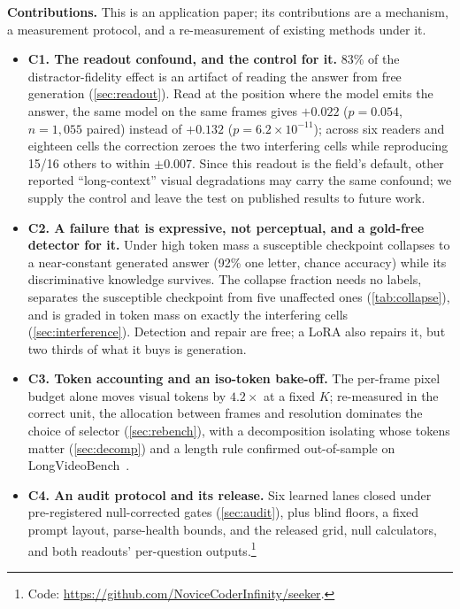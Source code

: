 \documentclass[10pt,twocolumn,letterpaper]{article}
\begin{document}
\noindent\textbf{Contributions.} This is an application paper; its contributions are a mechanism, a measurement protocol, and a re-measurement of existing methods under it.
\begin{itemize}[leftmargin=*,itemsep=0pt,parsep=0pt,topsep=1pt]
\item \textbf{C1. The readout confound, and the control for it.} 83\% of the distractor-fidelity effect is an artifact of reading the answer from free generation (\cref{sec:readout}). Read at the position where the model emits the answer, the same model on the same frames gives $+0.022$ ($p{=}0.054$, $n{=}1{,}055$ paired) instead of $+0.132$ ($p{=}6.2{\times}10^{-11}$); across six readers and eighteen cells the correction zeroes the two interfering cells while reproducing 15/16 others to within $\pm0.007$. Since this readout is the field's default, other reported ``long-context'' visual degradations may carry the same confound; we supply the control and leave the test on published results to future work.
\item \textbf{C2. A failure that is expressive, not perceptual, and a gold-free detector for it.} Under high token mass a susceptible checkpoint collapses to a near-constant generated answer (92\% one letter, chance accuracy) while its discriminative knowledge survives. The collapse fraction needs no labels, separates the susceptible checkpoint from five unaffected ones (\cref{tab:collapse}), and is graded in token mass on exactly the interfering cells (\cref{sec:interference}). Detection and repair are free; a LoRA also repairs it, but two thirds of what it buys is generation.
\item \textbf{C3. Token accounting and an iso-token bake-off.} The per-frame pixel budget alone moves visual tokens by $4.2\times$ at a fixed $K$; re-measured in the correct unit, the allocation between frames and resolution dominates the choice of selector (\cref{sec:rebench}), with a decomposition isolating whose tokens matter (\cref{sec:decomp}) and a length rule confirmed out-of-sample on LongVideoBench~\cite{wu2024longvideobench}.
\item \textbf{C4. An audit protocol and its release.} Six learned lanes closed under pre-registered null-corrected gates (\cref{sec:audit}), plus blind floors, a fixed prompt layout, parse-health bounds, and the released grid, null calculators, and both readouts' per-question outputs.\footnote{Code: \url{https://github.com/NoviceCoderInfinity/seeker}.}
\end{itemize}
\end{document}
